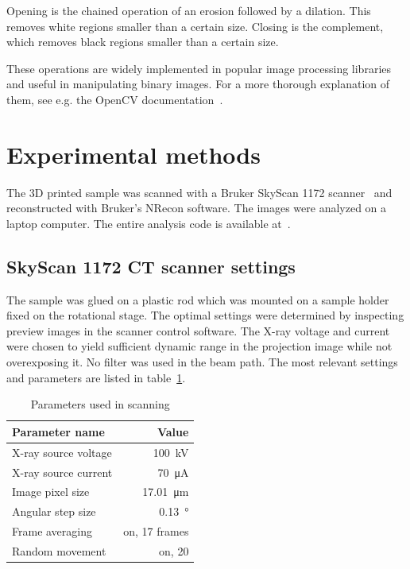 \documentclass[a4paper,twoside,12pt]{article}
\begin{document}
Opening is the chained operation of an erosion followed by a dilation. This removes white regions smaller than a certain size. Closing is the complement, which removes black regions smaller than a certain size.

These operations are widely implemented in popular image processing libraries and useful in manipulating binary images. For a more thorough explanation of them, see e.g. the OpenCV documentation~\cite{cv1, cv2}.

\section{Experimental methods}
The 3D printed sample was scanned with a Bruker SkyScan 1172 scanner~\cite{skyscan} and reconstructed with Bruker's NRecon software. The images were analyzed on a laptop computer. The entire analysis code is available at~\cite{code}.

\subsection{SkyScan 1172 CT scanner settings}
The sample was glued on a plastic rod which was mounted on a sample holder fixed on the rotational stage. The optimal settings were determined by inspecting preview images in the scanner control software. The X-ray voltage and current were chosen to yield sufficient dynamic range in the projection image while not overexposing it. No filter was used in the beam path. The most relevant settings and parameters are listed in table~\ref{table:settings}.

\begin{table}
    \centering
    \caption{Parameters used in scanning}
    \label{table:settings}
    \begin{tabular}{lr}
        \toprule
        Parameter name & Value \\
        \midrule
        X-ray source voltage & \SI{100}{\kilo\volt} \\
        X-ray source current & \SI{70}{\micro\ampere} \\
        Image pixel size & \SI{17.01}{\micro\meter} \\
        Angular step size & \SI{0.13}{\degree} \\
        Frame averaging & on, 17 frames \\
        Random movement & on, 20 \\
        \bottomrule
    \end{tabular}
\end{table}
\end{document}
